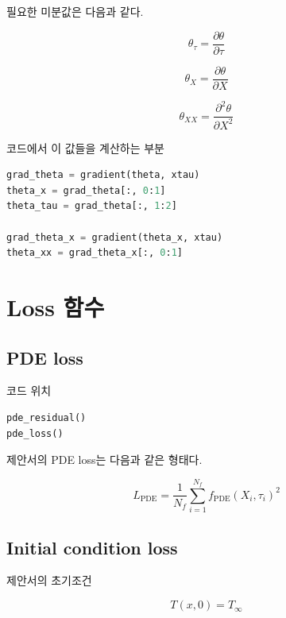 \documentclass[11pt]{article}
\begin{document}
필요한 미분값은 다음과 같다.

\begin{equation}
\theta_\tau =
\frac{\partial \theta}{\partial \tau}
\end{equation}

\begin{equation}
\theta_X =
\frac{\partial \theta}{\partial X}
\end{equation}

\begin{equation}
\theta_{XX} =
\frac{\partial^2 \theta}{\partial X^2}
\end{equation}

코드에서 이 값들을 계산하는 부분

\begin{lstlisting}[language=Python]
grad_theta = gradient(theta, xtau)
theta_x = grad_theta[:, 0:1]
theta_tau = grad_theta[:, 1:2]

grad_theta_x = gradient(theta_x, xtau)
theta_xx = grad_theta_x[:, 0:1]
\end{lstlisting}

\section{Loss 함수}

\subsection{PDE loss}

코드 위치

\begin{lstlisting}[language=Python]
pde_residual()
pde_loss()
\end{lstlisting}

제안서의 PDE loss는 다음과 같은 형태다.

\begin{equation}
L_{\mathrm{PDE}}
=
\frac{1}{N_f}
\sum_{i=1}^{N_f}
f_{\mathrm{PDE}}(X_i,\tau_i)^2
\end{equation}

\subsection{Initial condition loss}

제안서의 초기조건

\begin{equation}
T(x,0)=T_\infty
\end{equation}
\end{document}
